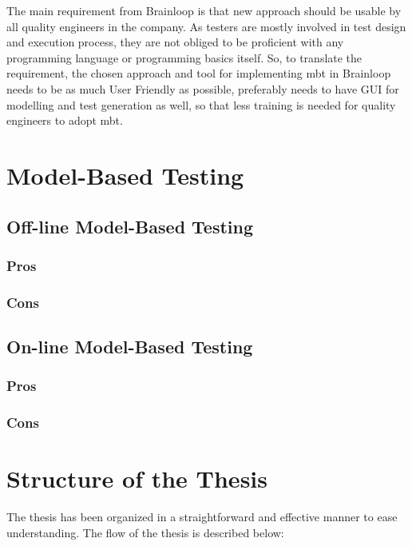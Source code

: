 \par
The main requirement from Brainloop is that new approach should be usable by all quality engineers in the company. As testers are mostly involved in test design and execution process, they are not obliged to be proficient with any programming language or programming basics itself. So, to translate the requirement, the chosen approach and tool for implementing \acrlong{mbt} in Brainloop needs to be as much User Friendly as possible, preferably needs to have GUI for modelling and test generation as well, so that less training is needed for quality engineers to adopt \acrlong{mbt}.

\section{Model-Based Testing}
\subsection{Off-line Model-Based Testing}
\subsubsection{Pros}
\subsubsection{Cons}
\subsection{On-line Model-Based Testing}
\subsubsection{Pros}
\subsubsection{Cons}

\section{Structure of the Thesis}
The thesis has been organized in a straightforward and effective manner to ease understanding. The flow of the thesis is described below:

